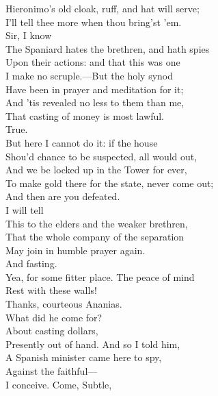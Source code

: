 \documentclass[a4paper,oneside]{memoir}
\begin{document}
\begin{drama*}
Hieronimo's old cloak, ruff, and hat will serve;\\
I'll tell thee more when thou bring'st 'em.\\
\ananiasspeaks {} Sir, I know\\
The Spaniard hates the brethren, and hath spies\\
Upon their actions: and that this was one\\
I make no scruple.---But the holy synod\\
Have been in prayer and meditation for it;\\
And 'tis revealed no less to them than me,\\
That casting of money is most lawful.\\
\subtlespeaks True.\\
But here I cannot do it: if the house\\
Shou'd chance to be suspected, all would out,\\
And we be locked up in the Tower for ever,\\
To make gold there for the state, never come out;\\
And then are you defeated.\\
\ananiasspeaks {} I will tell\\
This to the elders and the weaker brethren,\\
That the whole company of the separation\\
May join in humble prayer again.\\
\subtlespeaks {} And fasting.\\
\ananiasspeaks Yea, for some fitter place. The peace of mind\\
Rest with these walls!\\
\subtlespeaks {} Thanks, courteous Ananias.\\
\facespeaks What did he come for?\\
\subtlespeaks {} About casting dollars,\\
Presently out of hand. And so I told him,\\
A Spanish minister came here to spy,\\
Against the faithful---\\
\facespeaks {} I conceive. Come, Subtle,\\

\end{drama*}
\end{document}
